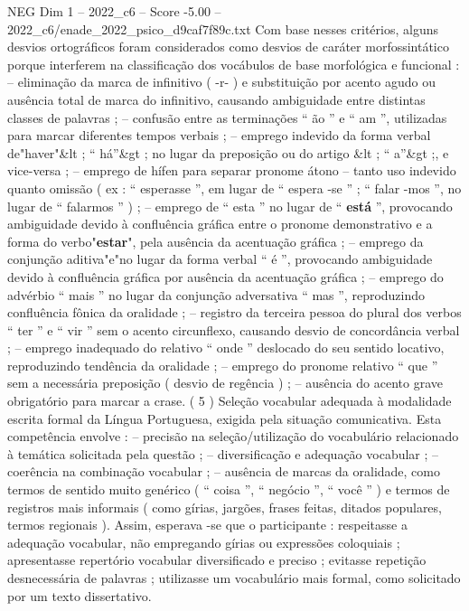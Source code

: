 \begin{textsample}{NEG Dim 1 – 2022\_c6 – Score -5.00 – 2022\_c6/enade\_2022\_psico\_d9caf7f89c.txt}
Com base nesses critérios, alguns desvios ortográficos foram considerados como desvios de caráter morfossintático porque interferem na classificação dos vocábulos de base morfológica e funcional : – eliminação da marca de infinitivo ( -r- ) e substituição por acento agudo ou ausência total de marca do infinitivo, causando ambiguidade entre distintas classes de palavras ; – confusão entre as terminações “ ão ” e “ am ”, utilizadas para marcar diferentes tempos verbais ; – emprego indevido da forma verbal de"haver"\&lt ; “ há”\&gt ; no lugar da preposição ou do artigo \&lt ; “ a”\&gt ;, e vice-versa ; – emprego de hífen para separar pronome átono – tanto uso indevido quanto omissão ( ex : “ esperasse ”, em lugar de “ espera -se ” ; “ falar -mos ”, no lugar de “ falarmos ” ) ; – emprego de “ esta ” no lugar de “ \textbf{está} ”, provocando ambiguidade devido à confluência gráfica entre o pronome demonstrativo e a forma do verbo"\textbf{estar}", pela ausência da acentuação gráfica ; – emprego da conjunção aditiva"e"no lugar da forma verbal “ é ”, provocando ambiguidade devido à confluência gráfica por ausência da acentuação gráfica ; – emprego do advérbio “ mais ” no lugar da conjunção adversativa “ mas ”, reproduzindo confluência fônica da oralidade ; – registro da terceira pessoa do plural dos verbos “ ter ” e “ vir ” sem o acento circunflexo, causando desvio de concordância verbal ; – emprego inadequado do relativo “ onde ” deslocado do seu sentido locativo, reproduzindo tendência da oralidade ; – emprego do pronome relativo “ que ” sem a necessária preposição ( desvio de regência ) ; – ausência do acento grave obrigatório para marcar a crase. ( 5 ) Seleção vocabular adequada à modalidade escrita formal da Língua Portuguesa, exigida pela situação comunicativa.
Esta competência envolve : – precisão na seleção/utilização do vocabulário relacionado à temática solicitada pela questão ; – diversificação e adequação vocabular ; – coerência na combinação vocabular ; – ausência de marcas da oralidade, como termos de sentido muito genérico ( “ coisa ”, “ negócio ”, “ você ” ) e termos de registros mais informais ( como gírias, jargões, frases feitas, ditados populares, termos regionais ).
Assim, esperava -se que o participante : respeitasse a adequação vocabular, não empregando gírias ou expressões coloquiais ; apresentasse repertório vocabular diversificado e preciso ; evitasse repetição desnecessária de palavras ; utilizasse um vocabulário mais formal, como solicitado por um texto dissertativo.

\end{textsample}
